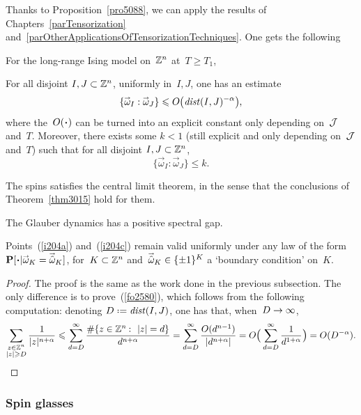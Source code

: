 Thanks to Proposition~\ref{pro5088}, we can apply the results of
Chapters~\ref{parTensorization} and~\ref{parOtherApplicationsOfTensorizationTechniques}.
One gets the following
%
\begin{Thm}\label{thm8777}
For the long-range Ising model on~$\mathbb{Z}^n$ at~$T\geq T_1$,
\begin{ienumerate}
\item\label{i204a} For all disjoint $I,J\subset\mathbb{Z}^n$, uniformly in~$I,J$, one has an estimate
\[\label{fo2580}
\{ \vec\omega_I : \vec\omega_J \} \leq O \big(\dist(I,J)^{-\alpha}\big) ,\]
where the~$O(\Bcdot)$ can be turned into an explicit constant only depending
on~$\mathcal{J}$ and~$T$.
Moreover, there exists some $k<1$
(still explicit and only depending on~$\mathcal{J}$ and~$T$)
such that for all disjoint $I,J\subset\mathbb{Z}^n$,
\[ \{ \vec\omega_I : \vec\omega_J \} \leq k .\]
%
\item\label{i204b} The spins satisfies
the central limit theorem, in the sense that the conclusions of Theorem~\ref{thm3015}
hold for them.
%
\item\label{i204c} The Glauber dynamics has a positive spectral gap.
%
\item\label{i204d}
Points~(\ref{i204a}) and~(\ref{i204c}) remain valid uniformly under any law of the form
$\Pr[\Bcdot|{\vec\omega_K=\vechat{\omega}_K}]$,
for~$K \subset \mathbb{Z}^n$ and~$\vechat{\omega}_K \in \{\pm1\}^K$ a `boundary condition' on~$K$.
\end{ienumerate}
\end{Thm}
%
\begin{proof}
The proof is the same as the work done in the previous subsection.
The only difference is to prove~(\ref{fo2580}),
which follows from the following computation:
denoting $D\coloneqq\dist(I,J)$, one has that, when~$D\to\infty$,
\[ \sum_{\substack{z\in\ZZ^n\\|z|\geq D}} \frac{1}{|z|^{n+\alpha}}
\leq \sum_{d=D}^\infty
\frac{\#\{z\in\ZZ^n\colon |z|=d\}}{d^{n+\alpha}}
= \sum_{d=D}^\infty \frac{O(d^{n-1})}{|d^{n+\alpha}|}
= O\Big( \sum_{d=D}^\infty \frac{1}{d^{1+\alpha}} \Big) = O(D^{-\alpha}). \]
\end{proof}


\subsubsection*{Spin glasses}

